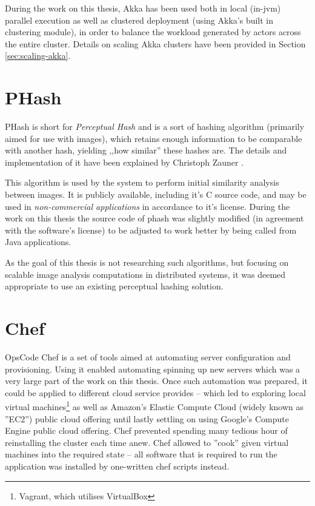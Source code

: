During the work on this thesis, Akka has been used both in local (in-jvm) parallel execution as well as clustered deployment (using Akka's built in clustering module), in order to balance the workload generated by actors across the entire cluster. Details on scaling Akka clusters have been provided in Section \ref{sec:scaling-akka}.

\section{PHash}
\label{sec:phash}
PHash is short for \textit{Perceptual Hash} and is a sort of hashing algorithm (primarily aimed for use with images), which retains enough information to be comparable with another hash, yielding ,,how similar'' these hashes are. The details and implementation of it have been explained by Christoph Zauner \cite{phash}.

This algorithm is used by the system to perform initial similarity analysis between images. It is publicly available, including it's C source code, and may be used in \textit{non-commercial applications} in accordance to it's license. During the work on this thesis the source code of phash was slightly modified (in agreement with the software's license) to be adjusted to work better by being called from Java applications.

As the goal of this thesis is not researching such algorithms, but focusing on scalable image analysis computations in distributed systems, it was deemed appropriate to use an existing perceptual hashing solution.

\section{Chef}
\label{sec:chef}
OpsCode Chef \cite{chef} is a set of tools aimed at automating server configuration and provisioning. Using it enabled automating spinning up new servers which was a very large part of the work on this thesis. Once such automation was prepared, it could     be applied to different cloud service provides -- which led to exploring local virtual machines\footnote{Vagrant, which utilises VirtualBox} as well as Amazon's Elastic Compute Cloud (widely known as ''EC2'') public cloud offering until lastly settling on using Google's Compute Engine public cloud offering. Chef prevented spending many  tedious hour of reinstalling the cluster each time anew. Chef allowed to ''cook'' given virtual machines into the required state -- all software that is required to run the application was installed by one-written chef scripts instead.

